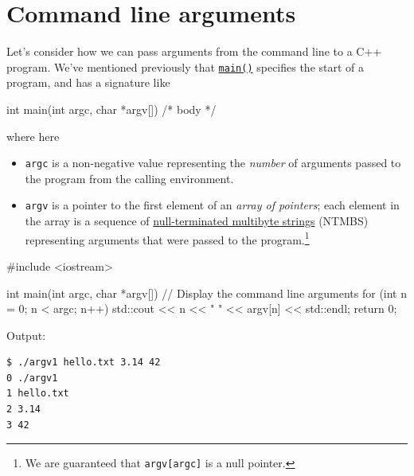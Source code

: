 \documentclass[12pt,letterpaper,twoside]{article}
\begin{document}
\section{Command line arguments}
Let's consider how we can pass arguments from the command line to a C++ program. 
We've mentioned previously that 
\href{https://en.cppreference.com/w/cpp/language/main_function}{\texttt{main()}} 
specifies the start of a program, and
has a signature like
\begin{cpp}
int main(int argc, char *argv[]) { /* body */ }
\end{cpp}
where here
\begin{itemize}   \item \texttt{argc} is a non-negative value representing the \emph{number} of arguments 
    passed to the program from the calling environment.
  \item \texttt{argv} is a pointer to the first element of an \emph{array of pointers}; 
    each element in the array is a sequence of 
    \href{https://en.cppreference.com/w/cpp/string/multibyte}
    {null-terminated multibyte strings} (NTMBS) 
    representing arguments that were passed to the 
    program.\footnote{We are guaranteed that \texttt{argv[argc]} is a null pointer.} \end{itemize}

\begin{cpp}
#include <iostream>

int main(int argc, char *argv[]) {
  // Display the command line arguments
  for (int n = 0; n < argc; n++) {
    std::cout << n << " " << argv[n] << std::endl;
  }
  return 0;
}
\end{cpp}

Output:

\begin{verbatim}
$ ./argv1 hello.txt 3.14 42
0 ./argv1
1 hello.txt
2 3.14
3 42
\end{verbatim}
\end{document}
